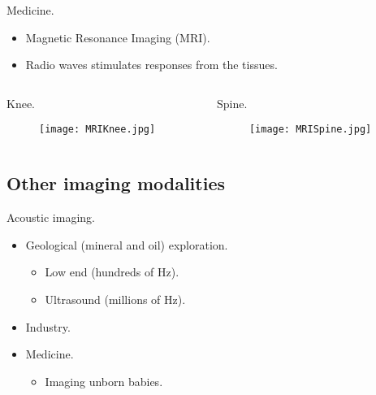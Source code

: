 \begin{frame}
Medicine.
\begin{itemize}
\item Magnetic Resonance Imaging (MRI).
\item Radio waves stimulates responses from the tissues.
\end{itemize}
\begin{columns}
\begin{column}{.48\textwidth}
Knee.
\begin{figure}
\texttt{[image: MRIKnee.jpg]}
\end{figure}
\end{column}
\begin{column}{.48\textwidth}
Spine.
\begin{figure}
\texttt{[image: MRISpine.jpg]}
\end{figure}
\end{column}
\end{columns}
\end{frame}


\subsection{Other imaging modalities}


\begin{frame}
Acoustic imaging.
\begin{itemize}
\item Geological (mineral and oil) exploration.
\begin{itemize}
\item Low end (hundreds of Hz).
\item Ultrasound (millions of Hz).
\end{itemize}
\item Industry.
\item Medicine.
\begin{itemize}
\item Imaging unborn babies.
\end{itemize}
\end{itemize}
\end{frame}


